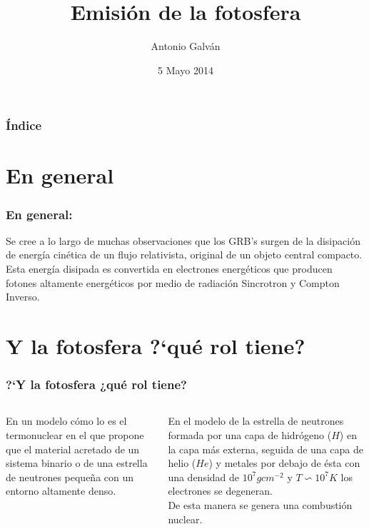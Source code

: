 \documentclass{beamer}
\title[Emisi\'on de la fotosfera]{\textbf{Emisi\'on de la fotosfera}}
\author{Antonio Galv\'an}
\date{5 Mayo 2014}
\institute{Instituto de Astronom\'ia\\ Facultad
 de Ciencias\\ U.N.A.M.}
\begin{document}
\begin{frame}
\titlepage
\end{frame}


\begin{frame}
\frametitle{\'Indice}
\tableofcontents
\end{frame}



\section{En general}

\begin{frame}
\frametitle{En general:} 
Se cree a lo largo de muchas observaciones que los GRB's surgen 
de la disipaci\'on de energ\'ia cin\'etica de un flujo relativista,
 original de un objeto central compacto.\\
Esta energ\'ia disipada es convertida en electrones energ\'eticos que
producen fotones altamente energ\'eticos por medio de radiaci\'on Sincrotron y 
Compton Inverso.
\end{frame}




\section{Y la fotosfera ?`qu\'e rol tiene?}
\begin{frame}
\frametitle{?`Y la fotosfera ¿qu\'e rol tiene?}
	\begin{columns}
	
		\begin{column}{5cm}
		En un modelo c\'omo lo es el termonuclear en el que propone que el material acretado
		de un sistema binario o de una estrella de neutrones peque\~na con un entorno altamente
		denso.
		\end{column}
		
		\begin{column}{5cm}
		En el modelo de la estrella de neutrones formada por una capa de hidr\'ogeno ($H$) en la capa
		m\'as externa, seguida de una capa de helio ($He$) y metales por debajo de \'esta con una densidad
		de $10^{7}g cm^{-2}$ y $T\backsim 10^{7}K $ los electrones se degeneran.\\
		De esta manera se genera una combusti\'on nuclear.
		\end{column}	
	\end{columns}
\end{frame}
\end{document}
